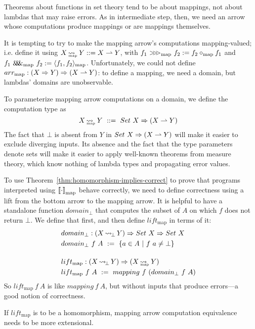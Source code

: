 \documentclass[preprint]{sigplanconf}
\newcommand{\arrow}{\rightsquigarrow}
\newcommand{\pto}{\rightharpoonup}
\newcommand{\arrowlift}{\ensuremath{lift}}
\newcommand{\arrowarr}{\ensuremath{arr}}
\newcommand{\arrowcomp}{\ensuremath{{>}\mspace{-6mu}{>}\mspace{-6mu}{>}}}
\newcommand{\arrowpair}{\ensuremath{\mathit{\&\mspace{-7.5mu}\&\mspace{-7.5mu}\&}}}
\DeclareMathOperator{\botto}{\arrow_{\mspace{-3mu}\bot}}
\newcommand{\map}{_\mathrm{map}}
\DeclareMathOperator{\mapto}{\arrow_{\mspace{-21mu}\map}}
\newcommand{\liftmap}{\arrowlift\map}
\newcommand{\arrmap}{\arrowarr\map}
\newcommand{\compmap}{\arrowcomp\map}
\newcommand{\pairmap}{\arrowpair\map}
\begin{document}
Theorems about functions in set theory tend to be about mappings, not about lambdas that may raise errors.
As in intermediate step, then, we need an arrow whose computations produce mappings or are mappings themselves.

It is tempting to try to make the mapping arrow's computations mapping-valued; i.e. define it using $X \mapto Y ::= X \pto Y$, with $f_1~\compmap~f_2 := f_2 \circ\map f_1$ and $f_1~\pairmap~f_2 := \pair{f_1,f_2}\map$.
Unfortunately, we could not define $\arrmap : (X \tto Y) \tto (X \pto Y)$: to define a mapping, we need a domain, but lambdas' domains are unobservable.

To parameterize mapping arrow computations on a domain, we define the  computation type as
\begin{equation}
	X \mapto Y \ ::= \ Set~X \tto (X \pto Y)
\end{equation}
The fact that $\bot$ is absent from $Y$ in $Set~X \tto (X \pto Y)$ will make it easier to exclude diverging inputs.
Its absence and the fact that the type parameters denote sets will make it easier to apply well-known theorems from measure theory, which know nothing of lambda types and propagating error values.

To use Theorem~\ref{thm:homomorphism-implies-correct} to prove that programs interpreted using $\meaningof{\cdot}\map$ behave correctly, we need to define correctness using a lift from the bottom arrow to the mapping arrow.
It is helpful to have a standalone function $domain_\bot$ that computes the subset of $A$ on which $f$ does not return $\bot$.
We define that first, and then define $\liftmap$ in terms of it:
\begin{align}
	&\begin{aligned}
		&domain_\bot : (X \botto Y) \tto Set~X \tto Set~X \\
		&domain_\bot~f~A \ := \ \setb{a \in A}{f~a \neq \bot}
	\end{aligned} \\
\nonumber \\[-6pt]
	&\begin{aligned}
		&\liftmap : (X \botto Y) \tto (X \mapto Y) \\
		&\liftmap~f~A \ := \ mapping~f~(domain_\bot~f~A)
	\end{aligned}
\end{align}
So $\liftmap~f~A$ is like $mapping~f~A$, but without inputs that produce errors---a good notion of correctness.

If $\liftmap$ is to be a homomorphism, mapping arrow computation equivalence needs to be more extensional.
\end{document}
